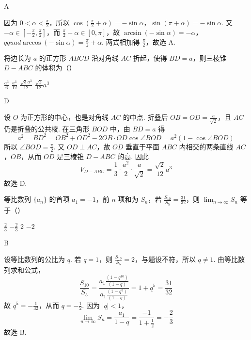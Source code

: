 \documentclass[UTF8,a4paper,oneside,11pt]{ctexbook}
\begin{document}
\begin{answer}
A
\end{answer}

\begin{solution}
因为 \(0<\alpha<\frac{\pi}{2}\)，所以
\(\cos\left(\frac{\pi}{2}+\alpha\right)=-\sin\alpha\)，\(\sin(\pi+\alpha)=-\sin\alpha\).
又 \(-\alpha\in[-\frac{\pi}{2},\frac{\pi}{2}]\)，而 \(\frac{\pi}{2}+\alpha\in[0,\pi]\)，故
\(\arcsin(-\sin\alpha)=-\alpha\)，\(qquad \arccos(-\sin\alpha)=\frac{\pi}{2}+\alpha\).
两式相加得 \(\frac{\pi}{2}\)，故选 A.
\end{solution}

\begin{problem}
将边长为 \(a\) 的正方形 \(ABCD\) 沿对角线 \(AC\) 折起，使得 \(BD = a\)，则三棱锥 \(D - ABC\) 的体积为（\quad）

\choices
    {\(\frac{a^3}{6}\)}
    {\(\frac{a^3}{12}\)}
    {\(\frac{\sqrt{3} a^3}{12}\)}
    {\(\frac{\sqrt{2}}{12} a^3\)}
\end{problem}

\begin{answer}
D
\end{answer}

\begin{solution}
设 \(O\) 为正方形的中心，也是对角线 \(AC\) 的中点. 折叠后 \(OB=OD=\frac{a}{\sqrt2}\)，且 \(AC\) 仍是折叠的公共棱. 在三角形 \(BOD\) 中，由 \(BD=a\) 得
\[
a^2=BD^2=OB^2+OD^2-2OB\cdot OD\cos\angle BOD
=a^2\left(1-\cos\angle BOD\right)
\]
所以 \(\angle BOD=\frac{\pi}{2}\). 又 \(OD\perp AC\)，故 \(OD\) 垂直于平面 \(ABC\) 内相交的两条直线 \(AC\)，\(OB\)，从而 \(OD\) 是三棱锥 \(D-ABC\) 的高. 因此
\[
V_{D-ABC}=\frac13\cdot\frac{a^2}{2}\cdot\frac{a}{\sqrt2}
=\frac{\sqrt2}{12}a^3
\]
故选 D.
\end{solution}

\begin{problem}
等比数列 \(\{a_{n}\}\) 的首项 \(a_1 = -1\)，前 \(n\) 项和为 \(S_{n}\)，若 \(\frac{S_{10}}{S_5} = \frac{31}{32}\)，则 \(\displaystyle\lim_{n\to \infty} S_n\) 等于（\quad）

\choices
    {\(\frac{2}{3}\)}
    {\(-\frac{2}{3}\)}
    {\(2\)}
    {\(-2\)}
\end{problem}

\begin{answer}
B
\end{answer}

\begin{solution}
设等比数列的公比为 \(q\). 若 \(q=1\)，则 \(\frac{S_{10}}{S_5}=2\)，与题设不符，所以 \(q\neq1\). 由等比数列求和公式，
\[
\frac{S_{10}}{S_5}
=\frac{a_1\frac{(1-q^{10})}{(1-q)}}{a_1\frac{(1-q^5)}{(1-q)}}
=1+q^5=\frac{31}{32}
\]
故 \(q^5=-\frac1{32}\)，从而 \(q=-\frac12\). 因为 \(\lvert q\rvert<1\)，
\[
\lim_{n\to\infty}S_n=\frac{a_1}{1-q}
=\frac{-1}{1+\frac12}=-\frac23
\]
故选 B.
\end{solution}
\end{document}
